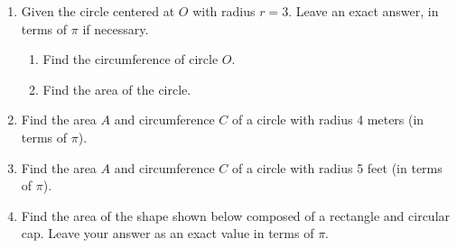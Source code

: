 \begin{enumerate}
\item Given the circle centered at $O$ with radius $r=3$. Leave an exact answer, in terms of $\pi$ if necessary.
  \begin{multicols}{2}
    \begin{enumerate}
      \item Find the circumference of circle $O$. %
      \item Find the area of the circle.\vspace{2cm}
    \end{enumerate}
  \end{multicols}

\item Find the area $A$ and circumference $C$ of a circle with radius 4 meters (in terms of $\pi$). 

\item Find the area $A$ and circumference $C$ of a circle with radius 5 feet (in terms of $\pi$). 
  
\newpage
    
\item Find the area of the shape shown below composed of a rectangle and circular cap. Leave your answer as an exact value in terms of $\pi$.
\begin{flushright}
\end{flushright}


\end{enumerate}
